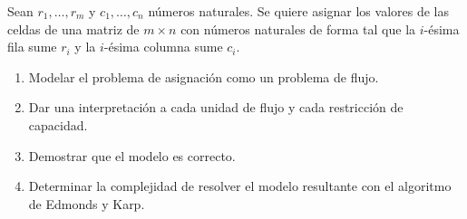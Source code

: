 
 \item Sean $r_1, \ldots, r_m$ y $c_1, \ldots, c_n$ números naturales. Se quiere asignar los valores de las celdas de una matriz de $m \times n$ con números naturales de forma tal que la $i$-ésima fila sume $r_i$ y la $i$-ésima columna sume $c_i$. 
 \begin{enumerate}[label=$\alph*)$,ref=$\alph*)$]
  \item Modelar el problema de asignación como un problema de flujo.
  \item Dar una interpretación a cada unidad de flujo y cada restricción de capacidad.
  \item Demostrar que el modelo es correcto.
  \item Determinar la complejidad de resolver el modelo resultante con el algoritmo de Edmonds y Karp.
 \end{enumerate}


